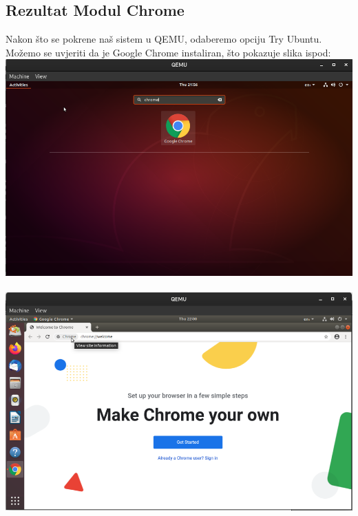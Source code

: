 \documentclass[12pt,vi]{mitthesis}
\begin{document}
\subsection*{Rezultat Modul Chrome}
\indent
Nakon što se pokrene naš sistem u QEMU, odaberemo opciju Try Ubuntu. Možemo se uvjeriti da je Google Chrome instaliran, što pokazuje slika ispod:\\
\includegraphics[width=\linewidth]{images/chromeLive.png}\\\\
\includegraphics[width=\linewidth]{images/chromeLive2.png}\\
\end{document}
